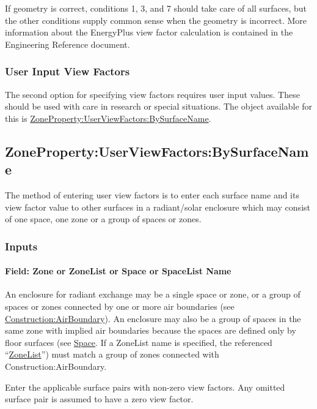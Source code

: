 If geometry is correct, conditions 1, 3, and 7 should take care of all surfaces, but the other conditions supply common sense when the geometry is incorrect. More information about the EnergyPlus view factor calculation is contained in the Engineering Reference document.

\subsubsection{User Input View Factors}\label{user-input-view-factors}

The second option for specifying view factors requires user input values. These should be used with care in research or special situations. The object available for this is \hyperref[zonepropertyuserviewfactorsbysurfacename]{ZoneProperty:UserViewFactors:BySurfaceName}.

\subsection{ZoneProperty:UserViewFactors:BySurfaceName}\label{zonepropertyuserviewfactorsbysurfacename}

The method of entering user view factors is to enter each surface name and its view factor value to other
surfaces in a radiant/solar enclosure which may consist of one space, one zone or a group of spaces or zones.

\subsubsection{Inputs}\label{inputs-17}

\paragraph{Field: Zone or ZoneList or Space or SpaceList Name}\label{zonepropertyuserviewfactorsbysurfacename-field-zone-name}

An enclosure for radiant exchange may be a single space or zone, or a group of spaces or zones connected by one or more air boundaries (see \hyperref[constructionairboundary]{Construction:AirBoundary}).  An enclosure may also be a group of spaces in the same zone with implied air boundaries because the spaces are defined only by floor surfaces (see \hyperref[space]{Space}.
If a ZoneList name is specified, the referenced ``\hyperref[zonelist]{ZoneList}'') must match a group of zones connected with Construction:AirBoundary.

Enter the applicable surface pairs with non-zero view factors. Any omitted surface pair is assumed to have a zero view factor.

